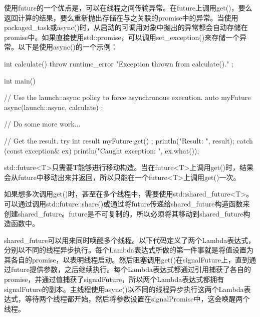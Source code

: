 
使用future的一个优点是，可以在线程之间传输异常。在future上调用get()，要么返回计算的结果，要么重新抛出存储在与之关联的promise中的异常。当使用packaged\_task或async()时，从启动的可调用对象中抛出的异常都会自动存储在promise中。如果直接使用std::promise，可以调用set\_exception()来存储一个异常。以下是使用async()的一个示例：

\begin{cpp}
int calculate()
{
    throw runtime_error { "Exception thrown from calculate()." };
}

int main()
{
    // Use the launch::async policy to force asynchronous execution.
    auto myFuture { async(launch::async, calculate) };

    // Do some more work...

    // Get the result.
    try {
        int result { myFuture.get() };
        println("Result: {}", result);
    } catch (const exception& ex) {
        println("Caught exception: {}", ex.what());
    }
}
\end{cpp}


std::future<T>只需要T能够进行移动构造。当在future<T>上调用get()时，结果会从future中移动出来并返回，所以只能在一个future<T>上调用get()一次。

如果想多次调用get()时，甚至在多个线程中，需要使用std::shared\_future<T>。可以通过调用std::future::share()或通过将future传递给shared\_future构造函数来创建shared\_future。future是不可复制的，所以必须将其移动到shared\_future构造函数中。

shared\_future可以用来同时唤醒多个线程。以下代码定义了两个Lambda表达式，分别以不同的线程异步执行。每个Lambda表达式所做的第一件事就是将值设置为其各自的promise，以表明线程启动。然后阻塞调用get()在signalFuture上，直到通过future提供参数，之后继续执行。每个Lambda表达式都通过引用捕获了各自的promise，并通过值捕获了signalFuture，所以两个Lambda表达式都拥有signalFuture的副本。主线程使用async()以不同的线程异步执行这两个Lambda表达式，等待两个线程都开始，然后将参数设置在signalPromise中，这会唤醒两个线程。


